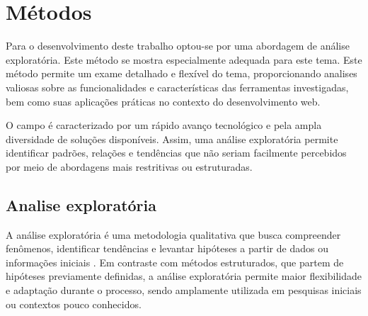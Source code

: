 \section{Métodos}\label{sec:metodo}
%
%
%
%

Para o desenvolvimento deste trabalho optou-se por uma abordagem de análise exploratória. Este método se mostra especialmente adequada para este tema. Este método permite um exame detalhado e flexível do tema, proporcionando analises valiosas sobre as funcionalidades e características das ferramentas investigadas, bem como suas aplicações práticas no contexto do desenvolvimento web.

O campo é caracterizado por um rápido avanço tecnológico e pela ampla diversidade de soluções disponíveis. Assim, uma análise exploratória permite identificar padrões, relações e tendências que não seriam facilmente percebidos por meio de abordagens mais restritivas ou estruturadas.

\subsection{Analise exploratória}
A análise exploratória é uma metodologia qualitativa que busca compreender fenômenos, identificar tendências e levantar hipóteses a partir de dados ou informações iniciais \cite{analise-exploratoria}. Em contraste com métodos estruturados, que partem de hipóteses previamente definidas, a análise exploratória permite maior flexibilidade e adaptação durante o processo, sendo amplamente utilizada em pesquisas iniciais ou contextos pouco conhecidos.

